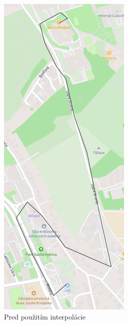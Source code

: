 \begin{figure}[H]
    \centering
    \begin{subfigure}{0.4\textwidth}
        \centering
        \includegraphics[width=.5\textwidth]{img/interpolacia bodov/before.png}
        \caption{Pred použitím interpolácie}
        \label{fig:before-interpolation}
    \end{subfigure}
    \begin{subfigure}{0.4\textwidth}
        \centering

\end{subfigure}
\end{figure}
